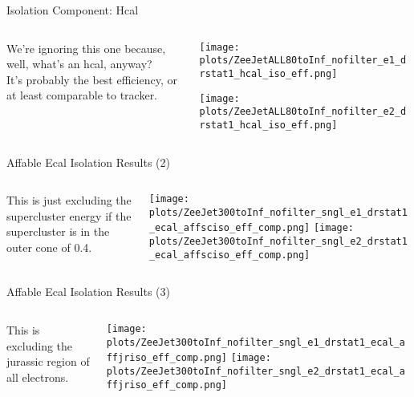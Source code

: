 \documentclass{beamer}
\begin{document}
\begin{frame}{Isolation Component: Hcal}
  \begin{columns}

    \begin{column}{0.4\textwidth}
      We're ignoring this one because, well, what's an hcal, anyway? \\ \bigskip
      It's probably the best efficiency, or at least comparable to tracker.
    \end{column}

    \begin{column}{0.6\textwidth}
      \texttt{[image: plots/ZeeJetALL80toInf\_nofilter\_e1\_drstat1\_hcal\_iso\_eff.png]}

      \texttt{[image: plots/ZeeJetALL80toInf\_nofilter\_e2\_drstat1\_hcal\_iso\_eff.png]}
    \end{column}
  \end{columns}

\end{frame}


\begin{frame}{Affable Ecal Isolation Results (2)}
  \begin{columns}%
    \begin{column}{0.3\textwidth}
      This is just excluding the supercluster energy if the supercluster is in the outer cone of 0.4.
    \end{column}

    \begin{column}{0.6\textwidth}
      \texttt{[image: plots/ZeeJet300toInf\_nofilter\_sngl\_e1\_drstat1\_ecal\_affsciso\_eff\_comp.png]}
      \vspace{-0.2cm}
      \texttt{[image: plots/ZeeJet300toInf\_nofilter\_sngl\_e2\_drstat1\_ecal\_affsciso\_eff\_comp.png]}
    \end{column}
  \end{columns}
\end{frame}


\begin{frame}{Affable Ecal Isolation Results (3)}
  \begin{columns}%
    \begin{column}{0.3\textwidth}
      This is excluding the jurassic region of all electrons.
    \end{column}

    \begin{column}{0.6\textwidth}
      \texttt{[image: plots/ZeeJet300toInf\_nofilter\_sngl\_e1\_drstat1\_ecal\_affjriso\_eff\_comp.png]}
      \vspace{-0.2cm}
      \texttt{[image: plots/ZeeJet300toInf\_nofilter\_sngl\_e2\_drstat1\_ecal\_affjriso\_eff\_comp.png]}
    \end{column}
  \end{columns}
\end{frame}
\end{document}
